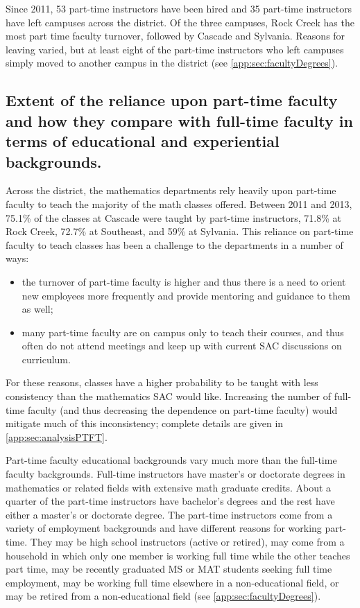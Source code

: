 Since 2011, 53 part-time instructors have been hired and 35 part-time
instructors have left campuses across the district.  Of the three campuses,
Rock Creek has the most part time faculty turnover, followed by Cascade and
Sylvania.  Reasons for leaving varied, but at least eight of the part-time
instructors who left campuses simply moved to another campus in the district
(see \vref{app:sec:facultyDegrees}).

\subsection[Part-time faculty]{Extent of the reliance upon part-time faculty and how they compare
with full-time faculty in terms of educational and experiential backgrounds.}
Across the district, the mathematics departments rely heavily upon part-time
faculty to teach the majority of the math classes offered.  Between 2011 and
2013, 75.1\% of the classes at Cascade were taught by part-time instructors,
71.8\% at Rock Creek, 72.7\% at Southeast, and 59\% at Sylvania.  This reliance
on part-time faculty to teach classes has been a challenge to the departments
in a number of ways:  
\begin{itemize}
\item the turnover of part-time faculty is higher and
thus there is a need to orient new employees more frequently and provide
mentoring and guidance to them as well;
\item many part-time faculty are on
campus only to teach their courses, and thus often do not attend meetings and
keep up with current SAC discussions on curriculum.  
\end{itemize}
For these reasons, classes have a higher probability to be taught with less consistency than the
mathematics SAC would like.  Increasing the number of full-time faculty (and
thus decreasing the dependence on part-time faculty) would mitigate much of
this inconsistency; complete details are given in  \vref{app:sec:analysisPTFT}.

Part-time faculty educational backgrounds vary much more than the full-time
faculty backgrounds.  Full-time instructors have master's or doctorate degrees
in mathematics or related fields with extensive math graduate credits.  About a
quarter of the part-time instructors have bachelor's degrees and the rest have
either a master's or doctorate degree.  The part-time instructors come from a
variety of employment backgrounds and have different reasons for working
part-time.  They may be high school instructors (active or retired), may come
from a household in which only one member is working full time while the other
teaches part time, may be recently graduated MS or MAT students seeking full
time employment, may be working full time elsewhere in a non-educational field,
or may be retired from a non-educational field (see
\vref{app:sec:facultyDegrees}).

